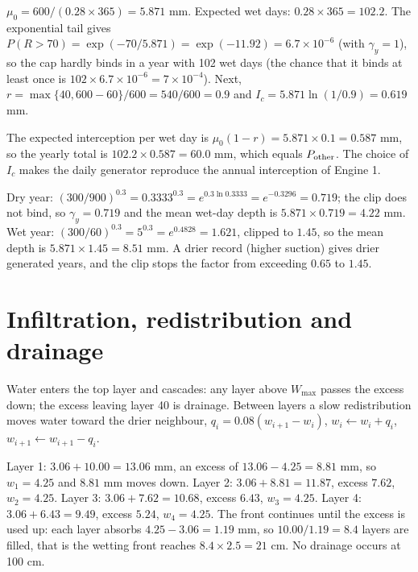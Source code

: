 \sol  $\mu_0=600/(0.28\times365)=5.871$ mm. Expected wet days: $0.28\times365=102.2$. The exponential tail gives $P(R>70)=\exp(-70/5.871)=\exp(-11.92)=6.7\times10^{-6}$ (with $\gamma_y=1$), so the cap hardly binds in a year with 102 wet days (the chance that it binds at least once is $102\times6.7\times10^{-6}=7\times10^{-4}$). Next, $r=\max\{40,600-60\}/600=540/600=0.9$ and $I_c=5.871\ln(1/0.9)=0.619$ mm.

 The expected interception per wet day is $\mu_0(1-r)=5.871\times0.1=0.587$ mm, so the yearly total is $102.2\times0.587=60.0$ mm, which equals $P_{\rm other}$. The choice of $I_c$ makes the daily generator reproduce the annual interception of Engine 1.


\sol  Dry year: $(300/900)^{0.3}=0.3333^{0.3}=e^{0.3\ln0.3333}=e^{-0.3296}=0.719$; the clip does not bind, so $\gamma_y=0.719$ and the mean wet-day depth is $5.871\times0.719=4.22$ mm. Wet year: $(300/60)^{0.3}=5^{0.3}=e^{0.4828}=1.621$, clipped to $1.45$, so the mean depth is $5.871\times1.45=8.51$ mm. A drier record (higher suction) gives drier generated years, and the clip stops the factor from exceeding $0.65$ to $1.45$.


\section{Infiltration, redistribution and drainage}
Water enters the top layer and cascades: any layer above $W_{\max}$ passes the excess down; the excess leaving layer 40 is drainage. Between layers a slow redistribution moves water toward the drier neighbour, $q_i=0.08(w_{i+1}-w_i)$, $w_i\leftarrow w_i+q_i$, $w_{i+1}\leftarrow w_{i+1}-q_i$.

\sol  Layer 1: $3.06+10.00=13.06$ mm, an excess of $13.06-4.25=8.81$ mm, so $w_1=4.25$ and $8.81$ mm moves down. Layer 2: $3.06+8.81=11.87$, excess $7.62$, $w_2=4.25$. Layer 3: $3.06+7.62=10.68$, excess $6.43$, $w_3=4.25$. Layer 4: $3.06+6.43=9.49$, excess $5.24$, $w_4=4.25$. The front continues until the excess is used up: each layer absorbs $4.25-3.06=1.19$ mm, so $10.00/1.19=8.4$ layers are filled, that is the wetting front reaches $8.4\times2.5=21$ cm. No drainage occurs at 100 cm.

